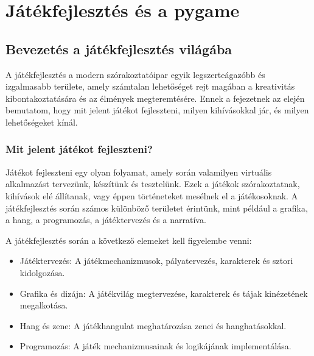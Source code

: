 \chapter{Játékfejlesztés és a pygame}

\section{Bevezetés a játékfejlesztés világába}

\indent \indent A játékfejlesztés a modern szórakoztatóipar egyik legszerteágazóbb és izgalmasabb területe, amely számtalan lehetőséget rejt magában a kreativitás kibontakoztatására és az élmények megteremtésére. Ennek a fejezetnek az elején bemutatom, hogy mit jelent játékot fejleszteni, milyen kihívásokkal jár, és milyen lehetőségeket kínál.

\subsection{Mit jelent játékot fejleszteni?}
\indent \indent Játékot fejleszteni egy olyan folyamat, amely során valamilyen virtuális alkalmazást tervezünk, készítünk és tesztelünk. Ezek a játékok szórakoztatnak, kihívások elé állítanak, vagy éppen történeteket mesélnek el a játékosoknak. A játékfejlesztés során számos különböző területet érintünk, mint például a grafika, a hang, a programozás, a játéktervezés és a narratíva.

A játékfejlesztés során a következő elemeket kell figyelembe venni:

\begin{itemize}
    \item Játéktervezés: A játékmechanizmusok, pályatervezés, karakterek és sztori kidolgozása.
    \item Grafika és dizájn: A játékvilág megtervezése, karakterek és tájak kinézetének megalkotása.
    \item Hang és zene: A játékhangulat meghatározása zenei és hanghatásokkal.
    \item Programozás: A játék mechanizmusainak és logikájának implementálása.
\end{itemize}
